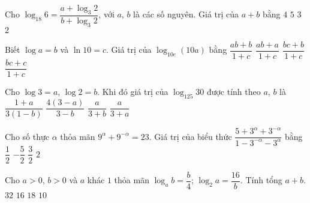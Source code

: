 \begin{ex}
	Cho $\log_{18} 6=\dfrac{a+\log_3 2}{b+\log_3 2}$, với $a$, $b$ là các số nguyên. Giá trị của $a+b$ bằng
	\choice
	{$4$}
	{$5$}
	{\True $3$}
	{$2$}
\end{ex}
\begin{ex}
	Biết $\log a=b$ và $\ln 10=c$. Giá trị của $\log _{10 e}(10 a)$ bằng
	\choice
	{$\dfrac{ab+b}{1+c}$}
	{$\dfrac{ab+a}{1+c}$}
	{$\dfrac{bc+b}{1+c}$}
	{\True $\dfrac{b c+c}{1+c}$}
\end{ex}
\begin{ex}
	Cho $\log3=a$, $\log2=b$. Khi đó giá trị của $\log_{125}30$ được tính theo $a$, $b$ là 
	\choice
	{\True $\dfrac{1+a}{3(1-b)}$}
	{$\dfrac{4(3-a)}{3-b}$}
	{$\dfrac{a}{3+b}$}
	{$\dfrac{a}{3+a}$}
\end{ex}
\begin{ex}
	Cho số thực $\alpha$ thỏa mãn $9^{\alpha}+9^{-\alpha}=23$. Giá trị của biểu thức $\dfrac{5+3^{\alpha}+3^{-\alpha}}{1-3^{-\alpha}-3^{\alpha}}$ bằng	
	\choice
	{$\dfrac{1}{2}$}
	{\True $-\dfrac{5}{2}$}
	{$\dfrac{3}{2}$}
	{$2$}
\end{ex}
\begin{ex}
	Cho $a>0$, $b>0$ và $a$ khác $1$ thỏa mãn $\log_{a}b=\dfrac{b}{4}$; $\log_{2}a=\dfrac{16}{b}$. Tính tổng $a+b$.
	\choice
	{$32$}
	{$16$}
	{\True $18$}
	{$10$}
\end{ex}


